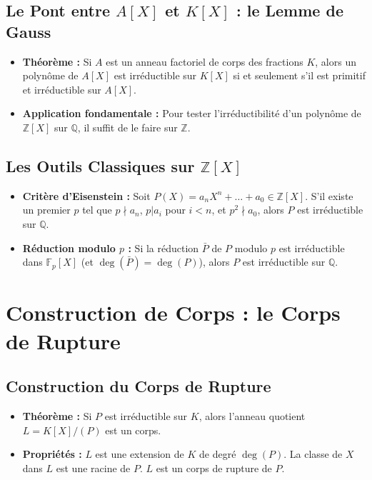 \documentclass[12pt, a4paper, parskip=full]{report}
\theoremstyle{agregstyle}
\begin{document}
\subsection{Le Pont entre $A[X]$ et $K[X]$ : le Lemme de Gauss}
\begin{itemize}
    \item \textbf{Théorème :} Si $A$ est un anneau factoriel de corps des fractions $K$, alors un polynôme de $A[X]$ est irréductible sur $K[X]$ si et seulement s'il est primitif et irréductible sur $A[X]$.
    \item \textbf{Application fondamentale :} Pour tester l'irréductibilité d'un polynôme de $\mathbb{Z}[X]$ sur $\mathbb{Q}$, il suffit de le faire sur $\mathbb{Z}$.
\end{itemize}
\subsection{Les Outils Classiques sur $\mathbb{Z}[X]$}
\begin{itemize}
    \item \textbf{Critère d'Eisenstein :} Soit $P(X) = a_n X^n + \dots + a_0 \in \mathbb{Z}[X]$. S'il existe un premier $p$ tel que $p \nmid a_n$, $p | a_i$ pour $i<n$, et $p^2 \nmid a_0$, alors $P$ est irréductible sur $\mathbb{Q}$.
    \item \textbf{Réduction modulo $p$ :} Si la réduction $\bar{P}$ de $P$ modulo $p$ est irréductible dans $\mathbb{F}_p[X]$ (et $\deg(\bar{P})=\deg(P)$), alors $P$ est irréductible sur $\mathbb{Q}$.
\end{itemize}

\section{Construction de Corps : le Corps de Rupture}
\subsection{Construction du Corps de Rupture}
\begin{itemize}
    \item \textbf{Théorème :} Si $P$ est irréductible sur $K$, alors l'anneau quotient $L = K[X]/(P)$ est un corps.
    \item \textbf{Propriétés :} $L$ est une extension de $K$ de degré $\deg(P)$. La classe de $X$ dans $L$ est une racine de $P$. $L$ est un corps de rupture de $P$.
\end{itemize}
\end{document}
